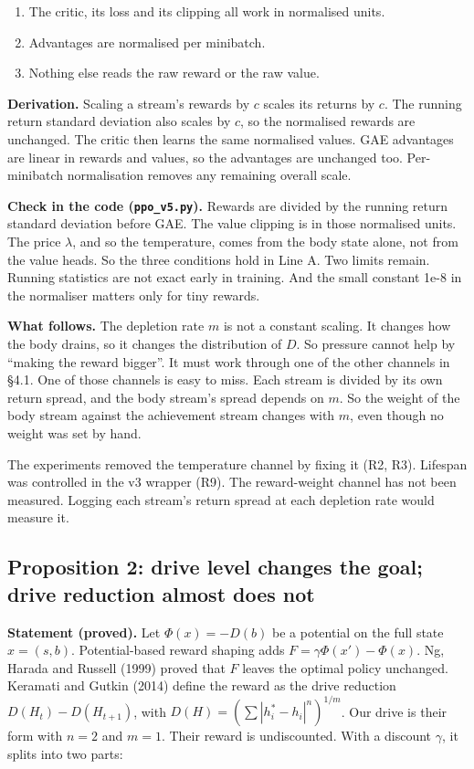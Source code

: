 \documentclass[11pt]{article}
\begin{document}
\begin{enumerate}
\item The critic, its loss and its clipping all work in normalised units.
\item Advantages are normalised per minibatch.
\item Nothing else reads the raw reward or the raw value.
\end{enumerate}

\textbf{Derivation.} Scaling a stream's rewards by $c$ scales its returns by $c$. The running return standard deviation also scales by $c$, so the normalised rewards are unchanged. The critic then learns the same normalised values. GAE advantages are linear in rewards and values, so the advantages are unchanged too. Per-minibatch normalisation removes any remaining overall scale.

\textbf{Check in the code (\texttt{ppo\_v5.py}).} Rewards are divided by the running return standard deviation before GAE. The value clipping is in those normalised units. The price $\lambda$, and so the temperature, comes from the body state alone, not from the value heads. So the three conditions hold in Line A. Two limits remain. Running statistics are not exact early in training. And the small constant 1e-8 in the normaliser matters only for tiny rewards.

\textbf{What follows.} The depletion rate $m$ is not a constant scaling. It changes how the body drains, so it changes the distribution of $D$. So pressure cannot help by ``making the reward bigger''. It must work through one of the other channels in §4.1. One of those channels is easy to miss. Each stream is divided by its own return spread, and the body stream's spread depends on $m$. So the weight of the body stream against the achievement stream changes with $m$, even though no weight was set by hand.

The experiments removed the temperature channel by fixing it (R2, R3). Lifespan was controlled in the v3 wrapper (R9). The reward-weight channel has not been measured. Logging each stream's return spread at each depletion rate would measure it.

\subsection{Proposition 2: drive level changes the goal; drive reduction almost does not}

\textbf{Statement (proved).} Let $\Phi(x) = -D(b)$ be a potential on the full state $x = (s, b)$. Potential-based reward shaping adds $F = \gamma\Phi(x') - \Phi(x)$. Ng, Harada and Russell (1999) proved that $F$ leaves the optimal policy unchanged. Keramati and Gutkin (2014) define the reward as the drive reduction $D(H_t) - D(H_{t+1})$, with $D(H) = (\sum |h^*_i - h_i|^n)^{1/m}$. Our drive is their form with $n = 2$ and $m = 1$. Their reward is undiscounted. With a discount $\gamma$, it splits into two parts:
\end{document}

